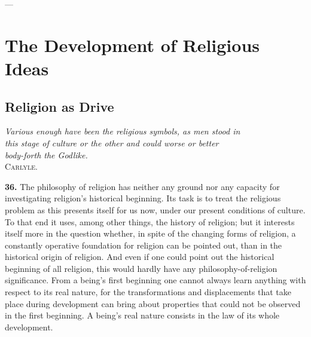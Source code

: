 \documentclass[12pt,a4paper]{book}
\newcommand{\opage}[1]{\marginnote{\footnotesize\textit{[#1]}}}
\begin{document}
\begin{center}---\end{center}

\section{The Development of Religious Ideas}
\label{sec:development}

\subsection{Religion as Drive}
\label{ssec:drive}

\begin{flushright}
\opage{85}
\textit{Various enough have been the religious symbols, as men stood in}\\
\textit{this stage of culture or the other and could worse or better}\\
\textit{body-forth the Godlike.}\\[2pt]
\textsc{Carlyle}.
\end{flushright}

\bigskip

\noindent\textbf{36.} The philosophy of religion has neither any ground nor any
capacity for investigating religion's historical beginning. Its task is to treat
the religious problem as this presents itself for us now, under our present
conditions of culture. To that end it uses, among other things, the history of
religion; but it interests itself more in the question whether, in spite of the
changing forms of religion, a constantly operative foundation for religion can be
pointed out, than in the historical origin of religion. And even if one could
point out the historical beginning of all religion, this would hardly have any
philosophy-of-religion significance. From a being's first beginning one cannot
always learn anything with respect to its real nature, for the transformations and
displacements that take place during development can bring about properties that
could not be observed in the first beginning. A being's real nature consists in the
law of its whole development.
\end{document}
